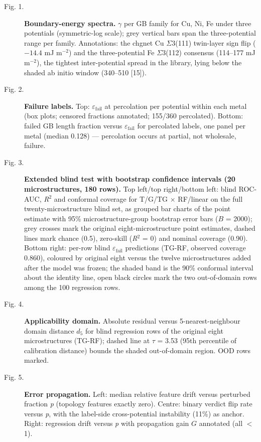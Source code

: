 \documentclass[preprint,12pt]{elsarticle}
\begin{document}
\begin{description}
\item[Fig. 1.] \textbf{Boundary-energy spectra.} $\gamma$ per GB family for Cu, Ni, Fe under three potentials (symmetric-log scale); grey vertical bars span the three-potential range per family. Annotations: the chgnet Cu $\Sigma$3(111) twin-layer sign flip ($-14.4$ mJ m$^{-2}$) and the three-potential Fe $\Sigma$3(112) consensus (114--177 mJ m$^{-2}$), the tightest inter-potential spread in the library, lying below the shaded ab initio window (340--510 [15]).
\item[Fig. 2.] \textbf{Failure labels.} Top: $\varepsilon_{\mathrm{fail}}$ at percolation per potential within each metal (box plots; censored fractions annotated; 155/360 percolated). Bottom: failed GB length fraction versus $\varepsilon_{\mathrm{fail}}$ for percolated labels, one panel per metal (median 0.128) --- percolation occurs at partial, not wholesale, failure.
\item[Fig. 3.] \textbf{Extended blind test with bootstrap confidence intervals (20 microstructures, 180 rows).} Top left/top right/bottom left: blind ROC-AUC, \textit{R}$^{2}$ and conformal coverage for T/G/TG $\times$ RF/linear on the full twenty-microstructure blind set, as grouped bar charts of the point estimate with 95\% microstructure-group bootstrap error bars ($B$ = 2000); grey crosses mark the original eight-microstructure point estimates, dashed lines mark chance (0.5), zero-skill (\textit{R}$^{2}$ = 0) and nominal coverage (0.90). Bottom right: per-row blind $\varepsilon_{\mathrm{fail}}$ predictions (TG-RF, observed coverage 0.860), coloured by original eight versus the twelve microstructures added after the model was frozen; the shaded band is the 90\% conformal interval about the identity line, open black circles mark the two out-of-domain rows among the 100 regression rows.
\item[Fig. 4.] \textbf{Applicability domain.} Absolute residual versus 5-nearest-neighbour domain distance $d_5$ for blind regression rows of the original eight microstructures (TG-RF); dashed line at $\tau$ = 3.53 (95th percentile of calibration distance) bounds the shaded out-of-domain region. OOD rows marked.
\item[Fig. 5.] \textbf{Error propagation.} Left: median relative feature drift versus perturbed fraction \textit{p} (topology features exactly zero). Centre: binary verdict flip rate versus \textit{p}, with the label-side cross-potential instability (11\%) as anchor. Right: regression drift versus \textit{p} with propagation gain $G$ annotated (all $<$ 1).
\end{description}
\end{document}
